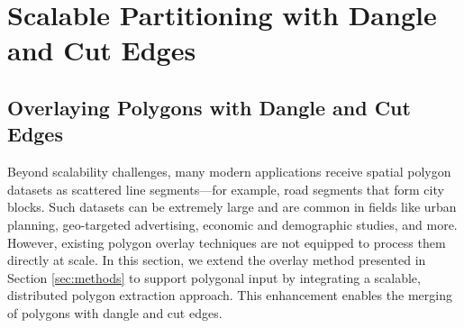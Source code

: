 \section{Scalable Partitioning with Dangle and Cut Edges} \label{sec:extension_methods}

% 
% 

\subsection{Overlaying Polygons with Dangle and Cut Edges} \label{sec:over_dang}

Beyond scalability challenges, many modern applications receive spatial polygon datasets as scattered line segments—for example, road segments that form city blocks. Such datasets can be extremely large and are common in fields like urban planning, geo-targeted advertising, economic and demographic studies, and more. However, existing polygon overlay techniques are not equipped to process them directly at scale. In this section, we extend the overlay method presented in Section \ref{sec:methods} to support polygonal input by integrating a scalable, distributed polygon extraction approach. This enhancement enables the merging of polygons with dangle and cut edges.

